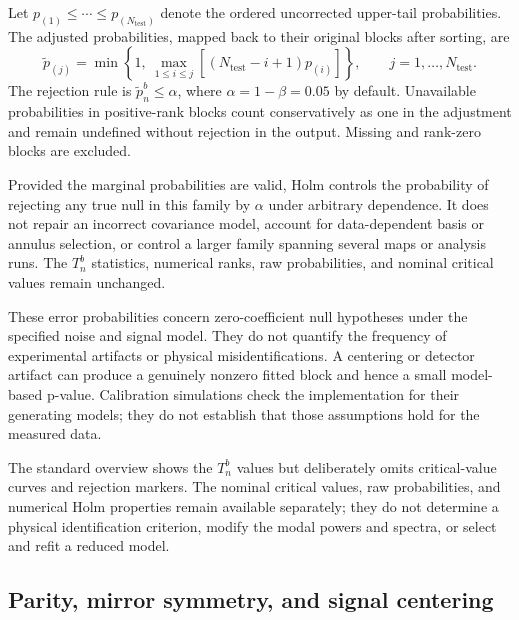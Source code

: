 \documentclass[aps,prb,preprint,onecolumn,notitlepage,amsmath,amssymb,
  superscriptaddress,floatfix]{revtex4-2}
\begin{document}
Let $p_{(1)}\leq\cdots\leq p_{(N_{\mathrm{test}})}$ denote the ordered
uncorrected upper-tail probabilities. The adjusted probabilities, mapped
back to their original blocks after sorting, are
\begin{equation}
 \widetilde p_{(j)}
 =\min\!\left\{1,\ \max_{1\leq i\leq j}
              \left[(N_{\mathrm{test}}-i+1)p_{(i)}\right]\right\},
 \qquad j=1,\ldots,N_{\mathrm{test}}.
 \label{eq:holm-pvalues}
\end{equation}
The rejection rule is $\widetilde p_n^b\leq\alpha$, where
$\alpha=1-\beta=0.05$ by default. Unavailable probabilities in positive-rank
blocks count conservatively as one in the adjustment and remain undefined
without rejection in the output. Missing and rank-zero blocks are excluded.

Provided the marginal probabilities are valid, Holm controls the
probability of rejecting any true null in this family by $\alpha$ under
arbitrary dependence. It does not repair an incorrect covariance model,
account for data-dependent basis or annulus selection, or control a larger
family spanning several maps or analysis runs. The $T_n^b$ statistics,
numerical ranks, raw probabilities, and nominal critical values remain
unchanged.

These error probabilities concern zero-coefficient null hypotheses under
the specified noise and signal model. They do not quantify the frequency
of experimental artifacts or physical misidentifications. A centering or
detector artifact can produce a genuinely nonzero fitted block and hence
a small model-based p-value. Calibration simulations check the
implementation for their generating models; they do not establish that
those assumptions hold for the measured data.

The standard overview shows the $T_n^b$ values but deliberately omits
critical-value curves and rejection markers. The nominal critical values,
raw probabilities, and numerical Holm properties remain available
separately; they do not determine a physical identification criterion,
modify the modal powers and spectra, or select and refit a reduced model.

\subsection{Parity, mirror symmetry, and signal centering}
\end{document}
